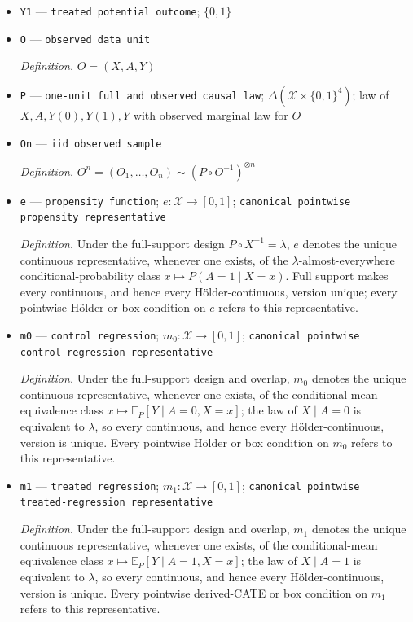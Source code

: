 \documentclass{article}
\begin{document}
\begin{itemize}
  \item \texttt{Y1} --- \texttt{treated potential outcome}; \(\{0,1\}\)
  \item \texttt{O} --- \texttt{observed data unit}
  \par\smallskip\noindent\emph{Definition.} \(O=(X,A,Y)\)
  \item \texttt{P} --- \texttt{one-\allowbreak{}unit full and observed causal law}; \(\Delta(\mathcal X\times\{0,1\}^4)\); law of \(X,A,Y(0),Y(1),Y\) with observed marginal law for \(O\)
  \item \texttt{On} --- \texttt{iid observed sample}
  \par\smallskip\noindent\emph{Definition.} \(O^n=(O_1,\ldots,O_n)\sim(P\circ O^{-1})^{\otimes n}\)
  \item \texttt{e} --- \texttt{propensity function}; \(e:\mathcal X\to[0,1]\); \texttt{canonical pointwise propensity representative}
  \par\smallskip\noindent\emph{Definition.} Under the full-support design \(P\circ X^{-1}=\lambda\), \(e\) denotes the unique continuous representative, whenever one exists, of the \(\lambda\)-almost-everywhere conditional-probability class \(x\mapsto P(A=1\mid X=x)\). Full support makes every continuous, and hence every Hölder-continuous, version unique; every pointwise Hölder or box condition on \(e\) refers to this representative.
  \item \texttt{m0} --- \texttt{control regression}; \(m_0:\mathcal X\to[0,1]\); \texttt{canonical pointwise control-\allowbreak{}regression representative}
  \par\smallskip\noindent\emph{Definition.} Under the full-support design and overlap, \(m_0\) denotes the unique continuous representative, whenever one exists, of the conditional-mean equivalence class \(x\mapsto\mathbb E_P[Y\mid A=0,X=x]\); the law of \(X\mid A=0\) is equivalent to \(\lambda\), so every continuous, and hence every Hölder-continuous, version is unique. Every pointwise Hölder or box condition on \(m_0\) refers to this representative.
  \item \texttt{m1} --- \texttt{treated regression}; \(m_1:\mathcal X\to[0,1]\); \texttt{canonical pointwise treated-\allowbreak{}regression representative}
  \par\smallskip\noindent\emph{Definition.} Under the full-support design and overlap, \(m_1\) denotes the unique continuous representative, whenever one exists, of the conditional-mean equivalence class \(x\mapsto\mathbb E_P[Y\mid A=1,X=x]\); the law of \(X\mid A=1\) is equivalent to \(\lambda\), so every continuous, and hence every Hölder-continuous, version is unique. Every pointwise derived-CATE or box condition on \(m_1\) refers to this representative.

\end{itemize}
\end{document}
